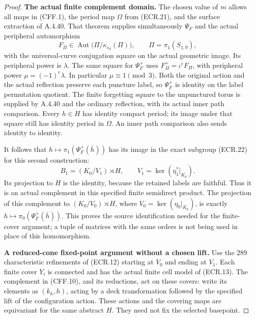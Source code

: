 \begin{proof}
\par\medskip\noindent\textbf{The actual finite complement domain.}\quad
The chosen value of $m$ allows all maps in (CFF.1), the period map
$\Omega$ from (ECR.21), and the surface extraction of A.4.40.
That theorem supplies simultaneously $\Psi_F$ and the actual
peripheral automorphism
\[
 F_\Pi\in\operatorname{Aut}
       \bigl(\Pi/\kappa_{s_0}(\Pi)\bigr),
 \qquad \Pi=\pi_1(S_{1,9}),
                                                               \tag{CFF.9}
\]
with the universal-curve conjugation square on the actual
geometric image.  Its peripheral power is $\lambda$.
The same square for $\Psi_F^+$ uses
$F_\Pi^+=\iota^e F_\Pi$, with peripheral power
$\mu=(-1)^e\lambda$.  In particular $\mu\equiv1\pmod3$.
Both the original action and the actual reflection preserve each
puncture label, so $\Psi_F^+$ is identity on the label permutation
quotient.  The finite forgetting square to the unpunctured torus
is supplied by A.4.40 and the ordinary reflection, with its actual
inner path comparison.  Every $h\in H$ has identity compact period;
its image under that square still has identity period in $\Omega$.
An inner path comparison also sends identity to identity.

It follows that
$h\mapsto\pi_1(\Psi_F^+(\bar h))$ has its image in the exact subgroup
(ECR.22) for this second construction:
\[
 B_1=(K_0/V_1)\rtimes H,\qquad
 V_1=\ker(\eta_1^*|_{K_0}).
                                                               \tag{CFF.10}
\]
Its projection to $H$ is the identity, because the retained labels
are faithful.  Thus it is an actual complement in this specified
finite semidirect product.  The projection of this complement to
$(K_0/V_0)\rtimes H$, where $V_0=\ker(\eta_0|_{K_0})$, is exactly
$h\mapsto\pi_0(\Psi_F^+(\bar h))$.
This proves the source identification needed for the finite-cover
argument; a tuple of matrices with the same orders is not being
used in place of this homomorphism.

\par\medskip\noindent\textbf{A reduced-cone fixed-point argument without a chosen lift.}\quad
Use the $289$ characteristic refinements of (ECR.12) starting at
$V_0$ and ending at $V_1$.  Each finite cover $Y_i$ is connected
and has the actual finite cell model of (ECR.13).  The complement
in (CFF.10), and its reductions, act on these covers: write its
elements as $(k_h,h)$, acting by a deck transformation followed
by the specified lift of the configuration action.  These actions
and the covering maps are equivariant for the same abstract $H$.
They need not fix the selected basepoint.


\end{proof}
